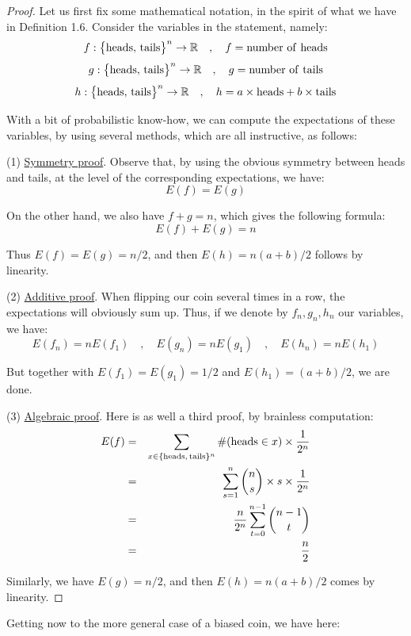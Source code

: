 \documentclass[12pt]{amsbook}
\begin{document}
\begin{proof}
Let us first fix some mathematical notation, in the spirit of what we have in Definition 1.6. Consider the variables in the statement, namely:
$$f:\big\{{\rm heads},\,{\rm tails}\big\}^n\to\mathbb R\quad,\quad f={\rm number\ of\ heads}$$ 
$$g:\big\{{\rm heads},\,{\rm tails}\big\}^n\to\mathbb R\quad,\quad g={\rm number\ of\ tails}$$ 
$$h:\big\{{\rm heads},\,{\rm tails}\big\}^n\to\mathbb R\quad,\quad h=a\times{\rm heads}+b\times{\rm tails}$$ 

With a bit of probabilistic know-how, we can compute the expectations of these variables, by using several methods, which are all instructive, as follows:

\medskip

(1) \underline{Symmetry proof}. Observe that, by using the obvious symmetry between heads and tails, at the level of the corresponding expectations, we have:
$$E(f)=E(g)$$

On the other hand, we also have $f+g=n$, which gives the following formula:
$$E(f)+E(g)=n$$

Thus $E(f)=E(g)=n/2$, and then $E(h)=n(a+b)/2$ follows by linearity.

\medskip

(2) \underline{Additive proof}. When flipping our coin several times in a row, the expectations will obviously sum up. Thus, if we denote by $f_n,g_n,h_n$ our variables, we have:
$$E(f_n)=nE(f_1)\quad,\quad E(g_n)=nE(g_1)\quad,\quad E(h_n)=nE(h_1)$$

But together with $E(f_1)=E(g_1)=1/2$ and $E(h_1)=(a+b)/2$, we are done.

\medskip

(3) \underline{Algebraic proof}. Here is as well a third proof, by brainless computation:
\begin{eqnarray*}
E(f)
&=&\sum_{x\in\{{\rm heads,\, tails}\}^n}\#({\rm heads}\in x)\times\frac{1}{2^n}\\
&=&\sum_{s=1}^n\binom{n}{s}\times s\times\frac{1}{2^n}\\
&=&\frac{n}{2^n}\sum_{t=0}^{n-1}\binom{n-1}{t}\\
&=&\frac{n}{2}
\end{eqnarray*}

Similarly, we have $E(g)=n/2$, and then $E(h)=n(a+b)/2$ comes by linearity.
\end{proof}

Getting now to the more general case of a biased coin, we have here:

\end{document}
